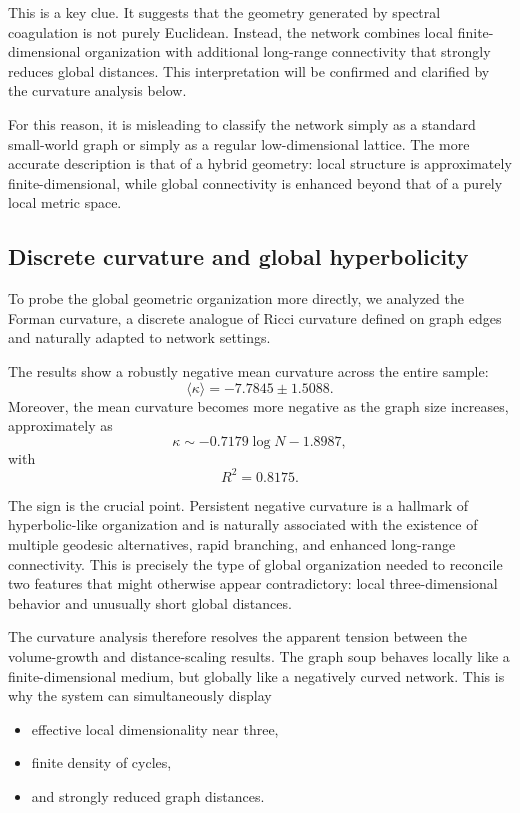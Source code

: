 \documentclass[11pt]{article}
\begin{document}
This is a key clue.
It suggests that the geometry generated by spectral coagulation is not purely Euclidean.
Instead, the network combines local finite-dimensional organization with additional long-range connectivity that strongly reduces global distances.
This interpretation will be confirmed and clarified by the curvature analysis below.

For this reason, it is misleading to classify the network simply as a standard small-world graph or simply as a regular low-dimensional lattice.
The more accurate description is that of a hybrid geometry:
local structure is approximately finite-dimensional, while global connectivity is enhanced beyond that of a purely local metric space.

\subsection{Discrete curvature and global hyperbolicity}
\label{sec:curvature}

To probe the global geometric organization more directly, we analyzed the Forman curvature, a discrete analogue of Ricci curvature defined on graph edges and naturally adapted to network settings.

The results show a robustly negative mean curvature across the entire sample:
\[
\langle \kappa \rangle = -7.7845 \pm 1.5088.
\]
Moreover, the mean curvature becomes more negative as the graph size increases, approximately as
\[
\kappa \sim -0.7179 \log N - 1.8987,
\]
with
\[
R^2 = 0.8175.
\]

The sign is the crucial point.
Persistent negative curvature is a hallmark of hyperbolic-like organization and is naturally associated with the existence of multiple geodesic alternatives, rapid branching, and enhanced long-range connectivity.
This is precisely the type of global organization needed to reconcile two features that might otherwise appear contradictory:
local three-dimensional behavior and unusually short global distances.

The curvature analysis therefore resolves the apparent tension between the volume-growth and distance-scaling results.
The graph soup behaves locally like a finite-dimensional medium, but globally like a negatively curved network.
This is why the system can simultaneously display
\begin{itemize}
\item effective local dimensionality near three,
\item finite density of cycles,
\item and strongly reduced graph distances.
\end{itemize}
\end{document}
